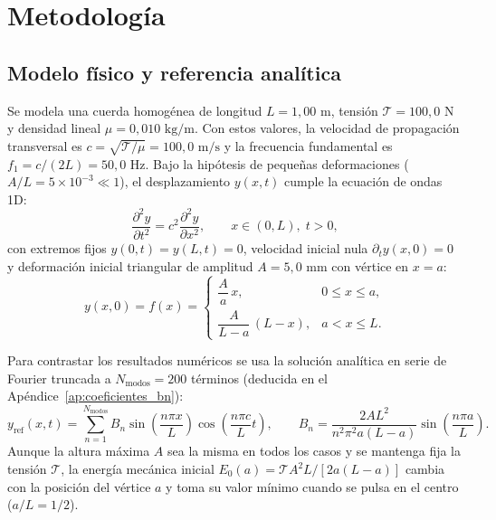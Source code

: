 \documentclass[11pt,a4paper]{article}
\begin{document}
\section{Metodología}

\subsection{Modelo físico y referencia analítica}

Se modela una cuerda homogénea de longitud $L = 1{,}00\text{ m}$, tensión $\mathcal{T} = 100{,}0\text{ N}$ y densidad lineal $\mu = 0{,}010\text{ kg/m}$. Con estos valores, la velocidad de propagación transversal es $c = \sqrt{\mathcal{T}/\mu} = 100{,}0\text{ m/s}$ y la frecuencia fundamental es $f_1 = c/(2L) = 50{,}0\text{ Hz}$. Bajo la hipótesis de pequeñas deformaciones ($A/L = 5 \times 10^{-3} \ll 1$), el desplazamiento $y(x,t)$ cumple la ecuación de ondas 1D:
\begin{equation}
\frac{\partial^2 y}{\partial t^2} = c^2 \frac{\partial^2 y}{\partial x^2}, \qquad x \in (0,L),\; t > 0,
\label{eq:onda_1d}
\end{equation}
con extremos fijos $y(0,t) = y(L,t) = 0$, velocidad inicial nula $\partial_t y(x,0) = 0$ y deformación inicial triangular de amplitud $A = 5{,}0\text{ mm}$ con vértice en $x = a$:
\begin{equation}
y(x,0) = f(x) = \begin{cases}
\dfrac{A}{a}\,x, & 0 \le x \le a, \\[6pt]
\dfrac{A}{L - a}\,(L - x), & a < x \le L.
\end{cases}
\label{eq:triangular}
\end{equation}

Para contrastar los resultados numéricos se usa la solución analítica en serie de Fourier truncada a $N_{\text{modos}} = 200$ términos (deducida en el Apéndice~\ref{ap:coeficientes_bn}):
\begin{equation}
y_{\text{ref}}(x,t) = \sum_{n=1}^{N_{\text{modos}}} B_n \sin\left(\frac{n\pi x}{L}\right) \cos\left(\frac{n\pi c}{L}t\right), \qquad B_n = \frac{2 A L^2}{n^2 \pi^2 a (L - a)} \sin\left(\frac{n\pi a}{L}\right).
\label{eq:sol_referencia}
\end{equation}
Aunque la altura máxima $A$ sea la misma en todos los casos y se mantenga fija la tensión $\mathcal{T}$, la energía mecánica inicial $E_0(a) = \mathcal{T}A^2 L / [2a(L-a)]$ cambia con la posición del vértice $a$ y toma su valor mínimo cuando se pulsa en el centro ($a/L = 1/2$).
\end{document}
